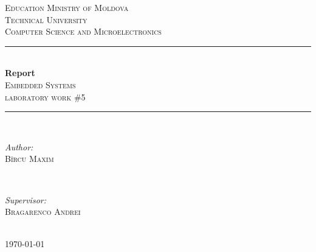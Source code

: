 \begin{titlepage}
\newcommand{\HRule}{\rule{\linewidth}{0.5mm}} 
\center
 

\textsc{\LARGE Education Ministry of Moldova}\\[1.5cm] 
\textsc{\Large Technical University}\\[0.5cm] 
\textsc{\large Computer Science and Microelectronics}\\[0.5cm]


\HRule \\[0.4cm]
{ \Huge \bfseries Report}\\[0.4cm]
\textsc{\large Embedded Systems}\\[0.5cm]
\textsc{ 
laboratory work \#5}\\[0.5cm]
\HRule \\[1.5cm]
 

\begin{minipage}{0.4\textwidth}
\begin{flushleft} \large
\emph{Author:}\\
\textsc{Bîrcu Maxim} %
\end{flushleft}
\end{minipage}
~
\begin{minipage}{0.4\textwidth}
\begin{flushright} \large
\emph{Supervisor:} \\
\textsc{Bragarenco Andrei} %
\end{flushright}
\end{minipage}\\[2cm]


\vfill
{\large \today}\\[2cm] %
\clearpage
 
\end{titlepage}